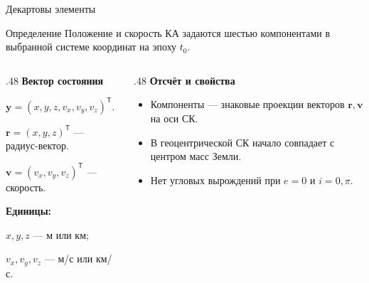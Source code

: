 \documentclass[11pt,aspectratio=169,t]{beamer}
\begin{document}
\begin{frame}{Декартовы элементы}
\begin{block}{Определение}
\justifying
Положение и скорость КА задаются шестью компонентами в выбранной системе координат на эпоху $t_0$.
\end{block}
\begin{columns}[T,onlytextwidth]
\begin{column}{.48\textwidth}
\textcolor{courseaccent}{\textbf{Вектор состояния}}
\par\smallskip
$\mathbf y=(x,y,z,v_x,v_y,v_z)^{\mathsf T}.$
\par\medskip
$\mathbf r=(x,y,z)^{\mathsf T}$ --- радиус-вектор.\par
$\mathbf v=(v_x,v_y,v_z)^{\mathsf T}$ --- скорость.
\par\medskip
\textbf{Единицы:}\par
$x,y,z$ --- м или км;\par
$v_x,v_y,v_z$ --- м/с или км/с.
\end{column}
\begin{column}{.48\textwidth}
\textcolor{courseaccent}{\textbf{Отсчёт и свойства}}
\begin{itemize}
\item Компоненты --- знаковые проекции векторов $\mathbf r,\mathbf v$ на оси СК.
\item В геоцентрической СК начало совпадает с центром масс Земли.
\item Нет угловых вырождений при $e=0$ и $i=0,\pi$.
\end{itemize}
\end{column}
\end{columns}
\end{frame}
\end{document}
